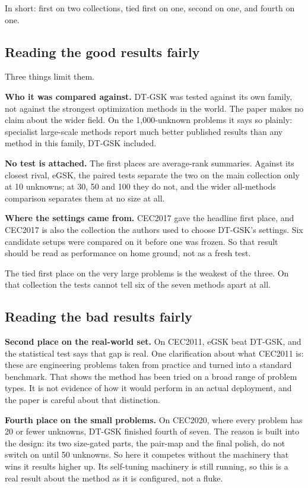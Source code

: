 \documentclass[11pt,a4paper]{article}
\newcommand{\hl}[1]{\textbf{#1}}
\begin{document}
In short: first on two collections, tied first on one, second on one, and fourth
on one.

\subsection{Reading the good results fairly}

Three things limit them.

\hl{Who it was compared against.} DT-GSK was tested against its own family, not
against the strongest optimization methods in the world. The paper makes no
claim about the wider field. On the 1{,}000-unknown problems it says so plainly:
specialist large-scale methods report much better published results than any
method in this family, DT-GSK included.

\hl{No test is attached.} The first places are average-rank summaries. Against
its closest rival, eGSK, the paired tests separate the two on the main
collection only at 10 unknowns; at 30, 50 and 100 they do not, and the wider
all-methods comparison separates them at no size at all.

\hl{Where the settings came from.} CEC2017 gave the headline first place, and
CEC2017 is also the collection the authors used to choose DT-GSK's settings.
Six candidate setups were compared on it before one was frozen. So that result
should be read as performance on home ground, not as a fresh test.

The tied first place on the very large problems is the weakest of the three. On
that collection the tests cannot tell six of the seven methods apart at all.

\subsection{Reading the bad results fairly}

\hl{Second place on the real-world set.} On CEC2011, eGSK beat DT-GSK, and the
statistical test says that gap is real. One clarification about what CEC2011 is:
these are engineering problems taken from practice and turned into a standard
benchmark. That shows the method has been tried on a broad range of problem
types. It is not evidence of how it would perform in an actual deployment, and
the paper is careful about that distinction.

\hl{Fourth place on the small problems.} On CEC2020, where every problem has 20
or fewer unknowns, DT-GSK finished fourth of seven. The reason is built into the
design: its two size-gated parts, the pair-map and the final polish, do not
switch on until 50 unknowns. So here it competes without the machinery that wins
it results higher up. Its self-tuning machinery is still running, so this is a
real result about the method as it is configured, not a fluke.
\end{document}
